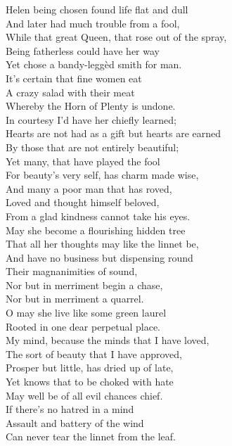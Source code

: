 \documentclass[a4,12pt]{article}
\begin{document}
\begin{center}
        \vspace{15pt}
        Helen being chosen found life flat and dull\\
        And later had much trouble from a fool,\\
        While that great Queen, that rose out of the spray,\\
        Being fatherless could have her way\\
        Yet chose a bandy-leggèd smith for man.\\
        It's certain that fine women eat\\
        A crazy salad with their meat\\
        Whereby the Horn of Plenty is undone.\\

        \vspace{15pt}
        In courtesy I'd have her chiefly learned;\\
        Hearts are not had as a gift but hearts are earned\\
        By those that are not entirely beautiful;\\
        Yet many, that have played the fool\\
        For beauty's very self, has charm made wise,\\
        And many a poor man that has roved,\\
        Loved and thought himself beloved,\\
        From a glad kindness cannot take his eyes.\\

        \vspace{15pt}
        May she become a flourishing hidden tree\\
        That all her thoughts may like the linnet be,\\
        And have no business but dispensing round\\
        Their magnanimities of sound,\\
        Nor but in merriment begin a chase,\\
        Nor but in merriment a quarrel.\\
        O may she live like some green laurel\\
        Rooted in one dear perpetual place.\\

        \vspace{15pt}
        My mind, because the minds that I have loved,\\
        The sort of beauty that I have approved,\\
        Prosper but little, has dried up of late,\\
        Yet knows that to be choked with hate\\
        May well be of all evil chances chief.\\
        If there's no hatred in a mind\\
        Assault and battery of the wind\\
        Can never tear the linnet from the leaf.\\


\end{center}
\end{document}
